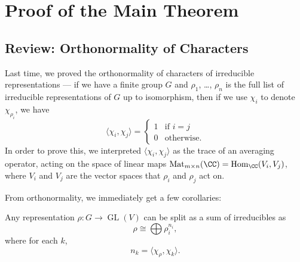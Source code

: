 


\section{Proof of the Main Theorem}

\subsection{Review: Orthonormality of Characters}

Last time, we proved the orthonormality of characters of irreducible representations --- if we have a finite group $G$ and $\rho_1$, \ldots, $\rho_n$ is the full list of irreducible representations of $G$ up to isomorphism, then if we use $\chi_i$ to denote $\chi_{\rho_i}$, we have \[\langle \chi_i, \chi_j \rangle = \begin{cases} 1 & \text{if $i = j$} \\ 0 & \text{otherwise}.\end{cases}\] 
In order to prove this, we interpreted $\langle \chi_i, \chi_j \rangle$ as the trace of an averaging operator, acting on the space of linear maps $\operatorname{Mat}_{m \times n}(\CC) = \operatorname{Hom}_{\CC}(V_i, V_j)$, where $V_i$ and $V_j$ are the vector spaces that $\rho_i$ and $\rho_j$ act on.

From orthonormality, we immediately get a few corollaries:

\begin{corollary} \label{coeffs from orthonormality}
    Any representation $\rho : G \to \operatorname{GL}(V)$ can be split as a sum of irreducibles as \[\rho \cong \bigoplus \rho_i^{n_i},\] where for each $k$, \[n_k = \langle \chi_\rho, \chi_k \rangle.\] 
\end{corollary}

